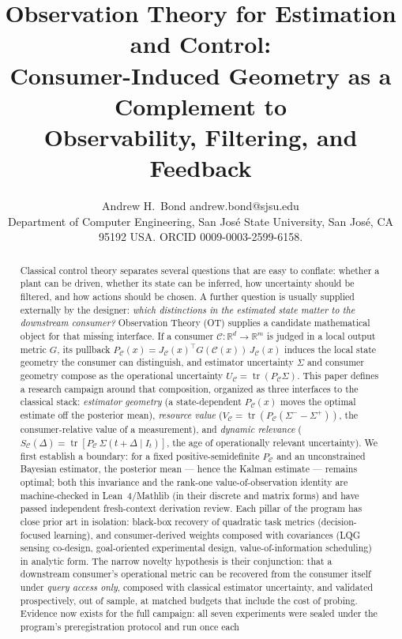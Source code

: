 \documentclass{article}
\title{Observation Theory for Estimation and Control:\\
Consumer-Induced Geometry as a Complement to\\
Observability, Filtering, and Feedback}
\author{\name Andrew H.~Bond \email andrew.bond@sjsu.edu \\
\addr Department of Computer Engineering, San Jos\'e State University,
San Jos\'e, CA 95192 USA. ORCID 0009-0003-2599-6158.}
\theoremstyle{definition}
\theoremstyle{remark}
\newcommand{\R}{\mathbb{R}}
\newcommand{\PC}{P_{\mathcal{C}}}
\newcommand{\tr}{\operatorname{tr}}
\newcommand{\C}{\mathcal{C}}
\newcommand{\Sig}{\Sigma}
\newcommand{\Sm}{\Sigma^{-}}
\newcommand{\Sp}{\Sigma^{+}}
\newcommand{\VC}{V_{\mathcal{C}}}
\newcommand{\UC}{U_{\mathcal{C}}}
\newcommand{\SC}{S_{\mathcal{C}}}
\begin{document}
\maketitle

\begin{abstract}
Classical control theory separates several questions that are easy to
conflate: whether a plant can be driven, whether its state can be inferred,
how uncertainty should be filtered, and how actions should be chosen. A
further question is usually supplied externally by the designer: \emph{which
distinctions in the estimated state matter to the downstream consumer?}
Observation Theory (OT) supplies a candidate mathematical object for that
missing interface. If a consumer $\C:\R^d\to\R^m$ is judged in a local output
metric $G$, its pullback $\PC(x)=J_\C(x)^{\top}G(\C(x))\,J_\C(x)$ induces the
local state geometry the consumer can distinguish, and estimator uncertainty
$\Sig$ and consumer geometry compose as the operational uncertainty
$\UC=\tr(\PC\Sig)$. This paper defines a research campaign around that
composition, organized as three interfaces to the classical stack:
\emph{estimator geometry} (a state-dependent $\PC(x)$ moves the optimal
estimate off the posterior mean), \emph{resource value}
($\VC=\tr(\PC(\Sm-\Sp))$, the consumer-relative value of a measurement), and
\emph{dynamic relevance} ($\SC(\Delta)=\tr[\PC\,\Sig(t{+}\Delta\mid I_t)]$,
the age of operationally relevant uncertainty). We first establish a
boundary: for a fixed positive-semidefinite $\PC$ and an unconstrained
Bayesian estimator, the posterior mean --- hence the Kalman estimate ---
remains optimal; both this invariance and the rank-one value-of-observation
identity are machine-checked in Lean~4/Mathlib (in their discrete and
matrix forms) and have passed independent fresh-context derivation review.
Each pillar of the program
has close prior art in isolation: black-box recovery of quadratic task
metrics (decision-focused learning), and consumer-derived weights composed
with covariances (LQG sensing co-design, goal-oriented experimental design,
value-of-information scheduling) in analytic form. The narrow novelty
hypothesis is their conjunction: that a downstream consumer's operational
metric can be recovered from the consumer itself under \emph{query access
only}, composed with classical estimator uncertainty, and validated
prospectively, out of sample, at matched budgets that include the cost of
probing. Evidence now exists for the full campaign: all seven experiments
were sealed under the program's preregistration protocol and run once each

\end{abstract}
\end{document}
